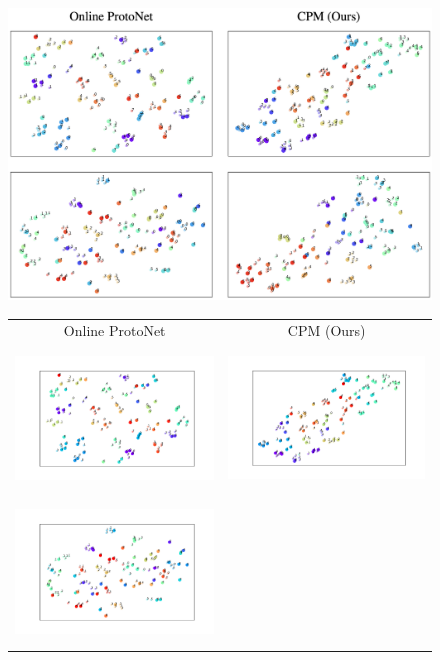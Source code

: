 \begin{figure}[t]
\centering
\iflatexml
    \includegraphics[width=6\linewidth]{figures/omniglot-tsne.png}
\else
    \begin{tabular}{cc}
    Online ProtoNet & CPM (Ours) \\
    \includegraphics[height=3.8cm, trim={2.5cm 1cm 2cm 1cm}, clip]{figures/omniglot-protonet-tsne/tsne-003.pdf}
    &
    \includegraphics[height=3.8cm, trim={2.5cm 1cm 2cm 1cm}, clip]{figures/omniglot-cpm-tsne/tsne-003.pdf}
    \\
    \includegraphics[height=3.8cm, trim={2.5cm 1cm 2cm 1cm}, clip]{figures/omniglot-protonet-tsne/tsne-008.pdf}

\end{tabular}
\end{figure}

